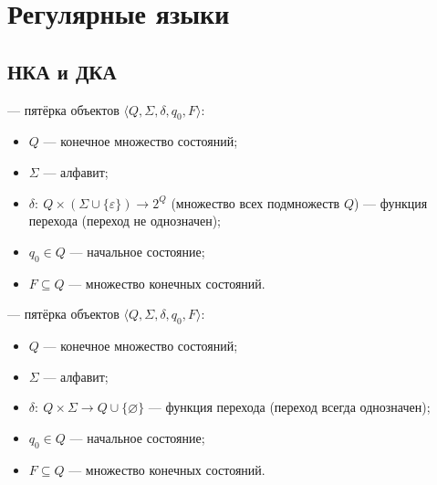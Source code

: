 \documentclass[11pt,a4paper]{article}
\newcommand{\rul}{\rightarrow}
\begin{document}
\section{Регулярные языки}

\subsection{НКА и ДКА}

\begin{opr}
 — пятёрка объектов $\langle Q,\Sigma,\delta,q_0,F\rangle$:
\begin{itemize}
\item $Q$ — конечное множество состояний;
\item $\Sigma$ — алфавит;
\item $\delta:\ Q\times(\Sigma\cup\{\varepsilon\})\rul2^Q$ (множество всех подмножеств $Q$) — функция перехода (переход не однозначен);
\item $q_0\in Q$ — начальное состояние;
\item $F\subseteq Q$ — множество конечных состояний.
\end{itemize}
\end{opr}

\begin{opr}
 — пятёрка объектов $\langle Q,\Sigma,\delta,q_0,F\rangle$:
\begin{itemize}
\item $Q$ — конечное множество состояний;
\item $\Sigma$ — алфавит;
\item $\delta:\ Q\times\Sigma\rul Q\cup\{\varnothing\}$ — функция перехода (переход всегда однозначен);
\item $q_0\in Q$ — начальное состояние;
\item $F\subseteq Q$ — множество конечных состояний.
\end{itemize}
\end{opr}
\end{document}

